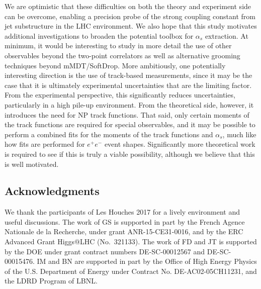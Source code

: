 \documentclass[11pt]{cernrep}
\begin{document}
We are optimistic that these difficulties on both the theory and experiment side can be overcome, enabling a precision probe of the strong coupling constant from jet substructure in the LHC environment.
%
We also hope that this study motivates additional investigations to broaden the potential toolbox for $\alpha_s$ extraction.
%
At minimum, it would be interesting to study in more detail the use of other observables beyond the two-point correlators as well as alternative grooming techniques beyond mMDT/SoftDrop.
%
More ambitiously, one potentially interesting direction is the use of track-based measurements, since it may be the case that it is ultimately experimental uncertainties that are the limiting factor.
%
From the experimental perspective, this significantly reduces uncertainties, particularly in a high pile-up environment.
%
From the theoretical side, however, it introduces the need for NP track functions.
%
That said, only certain moments of the track functions are required for special observables, and it may be possible to perform a combined fits for the moments of the track functions and $\alpha_s$, much like how fits are performed for $e^+e^-$ event shapes.
%
Significantly more theoretical work is required to see if this is truly a viable possibility, although we believe that this is well motivated.


\subsection*{Acknowledgments}

We thank the participants of Les Houches 2017 for a lively environment and useful discussions.
%
The work of GS is supported in part by the French Agence Nationale de la Recherche,
under grant ANR-15-CE31-0016, and by the ERC Advanced Grant Higgs@LHC
(No.\ 321133).
%
The work of FD and JT is supported by the DOE under grant contract numbers DE-SC-00012567 and DE-SC-00015476.
%
IM and BN are supported in part by the Office of High Energy Physics of the U.S. Department of Energy under Contract No. DE-AC02-05CH11231, and the LDRD Program of LBNL.


\end{document}
